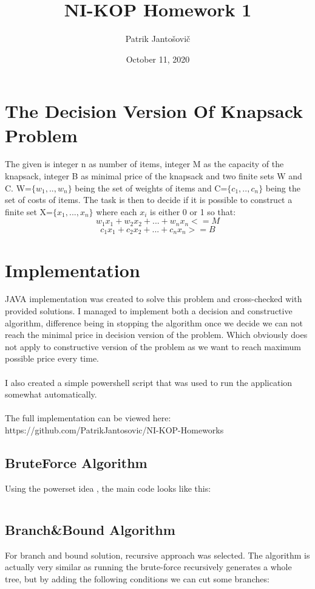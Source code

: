 \documentclass{article}
\title{NI-KOP Homework 1}
\author{Patrik Jantošovič}
\date{October 11, 2020}
\begin{document}
\maketitle

\section{The Decision Version Of Knapsack Problem}
The given is integer n as number of items, integer M as the capacity of the knapsack, integer B as minimal price of the knapsack and two finite sets W and C. W=$\{w_1, .., w_n\}$ being the set of weights of items and C=$\{c_1, .., c_n\}$ being the set of costs of items. The task is then to decide if it is possible to construct a finite set X=$\{x_1, ..., x_n\}$ where each $x_i$ is either 0 or 1 so that:
\begin{equation}
    w_1x_1 + w_2x_2 + ... + w_nx_n<= M
\end{equation}
\begin{equation}
    c_1x_1 + c_2x_2 + ... + c_nx_n >= B
\end{equation}

\section{Implementation}
JAVA implementation was created to solve this problem and cross-checked with provided solutions. I managed to implement both a decision and constructive algorithm, difference being in stopping the algorithm once we decide we can not reach the minimal price in decision version of the problem. Which obviously does not apply to constructive version of the problem as we want to reach maximum possible price every time.
\\
\\
I also created a simple powershell script that was used to run the application somewhat automatically.
\\
\\
The full implementation can be viewed here: https://github.com/PatrikJantosovic/NI-KOP-Homeworks

\subsection{BruteForce Algorithm}
Using the powerset idea \cite{pwset}, the main code looks like this:
\inputminted{java}{bf.java}

\subsection{Branch\&Bound Algorithm}
For branch and bound solution, recursive approach was selected. The algorithm is actually very similar as running the brute-force recursively generates a whole tree, but by adding the following conditions we can cut some branches:
\inputminted{java}{bb.java}
\end{document}
